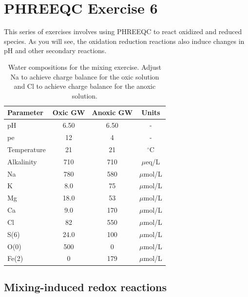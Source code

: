 \section[PHREEQC Exercise 6]{PHREEQC Exercise 6}

This series of exercises involves using PHREEQC to react 
oxidized and reduced species. As you will see, 
the oxidation reduction reactions 
also induce changes in pH and other secondary reactions.


\begin{table}[h]
\caption{Water compositions for the mixing exercise. Adjust Na to achieve charge balance for the oxic solution and Cl to achieve charge balance for the anoxic solution.}
\begin{center}
\begin{tabular}{lccc} 
\toprule
Parameter   & Oxic GW & Anoxic GW & Units  \\ \hline
pH          & 6.50 		& 6.50 			& -      \\
pe          & 12   		& 4    			& -      		\\
Temperature & 21   		& 21   			& $^\circ$C \\
Alkalinity  & 710  		& 710  			& $\mu$eq/L  		\\
Na          & 780  		& 580  			& $\mu$mol/L \\ 
K           & 8.0  		& 75   			& $\mu$mol/L \\
Mg          & 18.0 		& 53   			& $\mu$mol/L \\
Ca          & 9.0  		& 170  			& $\mu$mol/L \\ 
Cl          & 82   		& 550  			& $\mu$mol/L \\ 
S(6)        & 24.0 		& 100  			& $\mu$mol/L \\ 
O(0)        & 500  		& 0    			& $\mu$mol/L \\ 
Fe(2)       & 0    		& 179 			& $\mu$mol/L \\ 
\bottomrule
\end{tabular}
\label{tab:rdx2}
\end{center}
\end{table}

\subsection[Mixing-induced redox reactions]{Mixing-induced redox reactions}

